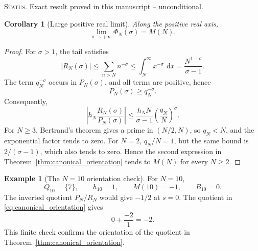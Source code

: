 \documentclass[11pt]{amsart}
\numberwithin{equation}{section}
\theoremstyle{plain}
\newtheorem{corollary}[theorem]{Corollary}
\theoremstyle{definition}
\newtheorem{example}[theorem]{Example}
\theoremstyle{remark}
\newcommand{\1}{\mathbf{1}}
\newcommand{\dd}{\,\mathrm{d}}
\newcommand{\statusnote}[1]{%
  \par\smallskip\noindent
  \begingroup\footnotesize\textsc{Status.} #1\endgroup
  \par\smallskip}
\begin{document}
\statusnote{Exact result proved in this manuscript -- unconditional.}
\begin{corollary}[Large positive real limit]
\label{cor:Phi_infinity}
Along the positive real axis,
\begin{equation}
\boxed{
\lim_{\sigma\to+\infty}\Phi_N(\sigma)=M(N).
}
\label{eq:Phi_infinity}
\end{equation}
\end{corollary}

\begin{proof}
For \(\sigma>1\), the tail satisfies
\begin{equation}
|R_N(\sigma)|
\leq
\sum_{n>N}n^{-\sigma}
\leq
\int_N^\infty x^{-\sigma}\,\dd x
=
\frac{N^{1-\sigma}}{\sigma-1}.
\label{eq:infinity_tail_bound}
\end{equation}
The term \(q_N^{-\sigma}\) occurs in \(P_N(\sigma)\), and all terms are
positive, hence
\begin{equation}
P_N(\sigma)\geq q_N^{-\sigma}.
\label{eq:infinity_denominator_bound}
\end{equation}
Consequently,
\begin{equation}
\left|h_N\frac{R_N(\sigma)}{P_N(\sigma)}\right|
\leq
\frac{h_NN}{\sigma-1}
\left(\frac{q_N}{N}\right)^\sigma.
\label{eq:infinity_ratio_bound}
\end{equation}
For \(N\geq3\), Bertrand's theorem gives a prime in \((N/2,N)\), so
\(q_N<N\), and the exponential factor tends to zero.  For \(N=2\),
\(q_N/N=1\), but the same bound is \(2/(\sigma-1)\), which also tends to
zero.  Hence the second expression in
Theorem~\ref{thm:canonical_orientation} tends to \(M(N)\) for every
\(N\geq2\).
\end{proof}

\begin{example}[The \(N=10\) orientation check]
\label{exp:N10_orientation}
For \(N=10\),
\begin{equation}
Q_{10}=\{7\},
\qquad
h_{10}=1,
\qquad
M(10)=-1,
\qquad
B_{10}=0.
\label{eq:N10_data}
\end{equation}
The inverted quotient \(P_N/R_N\) would give \(-1/2\) at \(s=0\).
The quotient in \eqref{eq:canonical_orientation} gives
\begin{equation}
0+\frac{-2}{1}=-2.
\label{eq:N10_correct_value}
\end{equation}
This finite check confirms the orientation of the quotient in Theorem~\ref{thm:canonical_orientation}.
\end{example}
\end{document}
